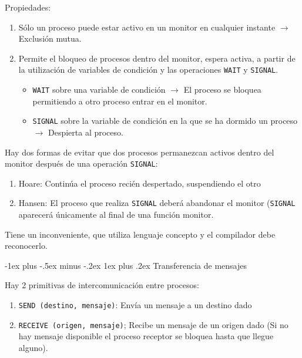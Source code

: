 \documentclass[10pt,portrait, twocolumn]{article}
\makeatletter
\renewcommand{\subsubsection}{\@startsection{subsubsection}{3}{0mm}%
                                {-1ex plus -.5ex minus -.2ex}%
                                {1ex plus .2ex}%
                                {\normalfont\small\bfseries}}
\makeatother
\begin{document}
Propiedades:

	\begin{enumerate}
		\item Sólo un proceso puede estar activo en un monitor en cualquier instante $\rightarrow$ Exclusión mutua.
		\item Permite el bloqueo de procesos dentro del monitor, espera activa, a partir de la utilización de variables de condición y las operaciones \texttt{WAIT} y \texttt{SIGNAL}.
			\begin{itemize}
			\item \texttt{WAIT} sobre una variable de condición $\rightarrow$ El proceso se bloquea permitiendo a otro proceso entrar en el monitor.
			\item \texttt{SIGNAL} sobre la variable de condición en la que se ha dormido un proceso $\rightarrow$ Despierta al proceso.
			\end{itemize}
	\end{enumerate}
	
Hay dos formas de evitar que dos procesos permanezcan activos dentro del monitor después de una operación \texttt{SIGNAL}:
	
	\begin{enumerate}
		\item Hoare: Continúa el proceso recién despertado, suspendiendo el otro
		\item Hansen: El proceso que realiza \texttt{SIGNAL} deberá abandonar el monitor (\texttt{SIGNAL} aparecerá únicamente al final de una función monitor.
	\end{enumerate}
	
Tiene un inconveniente, que utiliza lenguaje concepto y el compilador debe reconocerlo.
	
	
\subsubsection{Transferencia de mensajes}

Hay 2 primitivas de intercomunicación entre procesos:

	\begin{enumerate}
		\item \texttt{SEND (destino, mensaje)}: Envía un mensaje a un destino dado
		\item \texttt{RECEIVE (origen, mensaje)}; Recibe un mensaje de un origen dado (Si no hay mensaje disponible el proceso receptor se bloquea hasta que llegue alguno).
	\end{enumerate}
	
\end{document}
